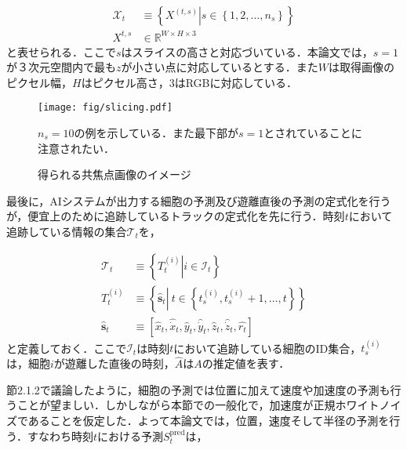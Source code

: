 \begin{equation}
    \begin{aligned}
        \mathcal{X}_t &\equiv \left\{ \left.X^{(t,s)}\right| s \in \left\{1,2,\dots,n_s\right\} \right\}
        \\ X^{t,s} &\in \mathbb{R}^{W \times H \times 3}
    \end{aligned}
\end{equation}
と表せられる．ここで$s$はスライスの高さと対応づいている．本論文では，$s=1$が３次元空間内で最も$z$が小さい点に対応しているとする．また$W$は取得画像のピクセル幅，$H$はピクセル高さ，$3$はRGBに対応している．

\begin{figure}[t]
    \centering
    \texttt{[image: fig/slicing.pdf]}
    \caption{得られる共焦点画像のイメージ}
    \small
    $n_s=10$の例を示している．また最下部が$s=1$とされていることに注意されたい．
    \label{fig:slicing}
\end{figure}

\par
最後に，AIシステムが出力する細胞の予測及び遊離直後の予測の定式化を行うが，便宜上のために追跡しているトラックの定式化を先に行う．時刻$t$において追跡している情報の集合$\mathcal{T}_t$を，

\begin{equation}
    \begin{aligned}
        \mathcal{T}_t &\equiv \left\{ \left. T_t^{(i)}\right|i \in \mathcal{I}_t\right\}
        \\ T_t^{(i)} &\equiv \left\{ \hat{\bm{s}}_t \left|\ t \in \left\{t_s^{(i)}, t_s^{(i)}+1,\dots, t\right\} \right.\right\}
        \\\hat{\bm{s}}_{t} &\equiv \left[\hat{x}_{t}, \hat{\dot{x}}_{t}, \hat{y}_{t}, \hat{\dot{y}}_{t}, \hat{z}_{t}, \hat{\dot{z}}_{t}, \hat{r_{t}}\right]
    \end{aligned}
\end{equation}
と定義しておく．ここで$\mathcal{I}_t$は時刻$t$において追跡している細胞のID集合，$t_s^{(i)}$は，細胞$i$が遊離した直後の時刻，$\hat{A}$は$A$の推定値を表す．

節2.1.2で議論したように，細胞の予測では位置に加えて速度や加速度の予測も行うことが望ましい．しかしながら本節での一般化で，加速度が正規ホワイトノイズであることを仮定した．よって本論文では，位置，速度そして半径の予測を行う．すなわち時刻$t$における予測$S^{\text{pred}}_t$は，

